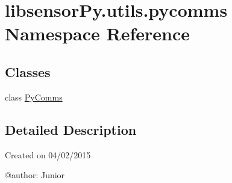 \hypertarget{namespacelibsensorPy_1_1utils_1_1pycomms}{}\section{libsensor\+Py.\+utils.\+pycomms Namespace Reference}
\label{namespacelibsensorPy_1_1utils_1_1pycomms}
\subsection*{Classes}
\begin{DoxyCompactItemize}
\item 
class \hyperlink{classlibsensorPy_1_1utils_1_1pycomms_1_1PyComms}{Py\+Comms}
\end{DoxyCompactItemize}


\subsection{Detailed Description}
\begin{DoxyVerb}Created on 04/02/2015

@author: Junior
\end{DoxyVerb}
 